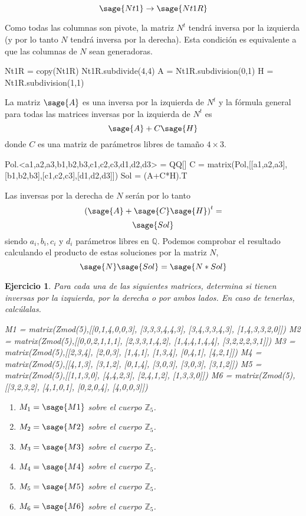 \documentclass{amsart}
\newtheorem{ejer}{Ejercicio}
\begin{document}
$$ \sage{Nt1} \to \sage{Nt1R}$$

Como todas las columnas son pivote, la matriz $N^t$ tendrá inversa por
la izquierda (y por lo tanto $N$ tendrá inversa por la derecha). Esta 
condición es equivalente a que las columnas de $N$ sean generadoras.

\begin{sageblock}
Nt1R = copy(Nt1R)
Nt1R.subdivide(4,4)
A = Nt1R.subdivision(0,1)
H = Nt1R.subdivision(1,1)
\end{sageblock}

La matriz $\sage{A}$ es una inversa por la izquierda de $N^t$ y la fórmula
general para todas las matrices inversas por la izquierda de $N^t$ es
$$ \sage{A} + C \sage{H} $$
donde $C$ es una matriz de parámetros libres de tamaño $4 \times 3$.

\begin{sageblock}
Pol.<a1,a2,a3,b1,b2,b3,c1,c2,c3,d1,d2,d3> = QQ[]
C = matrix(Pol,[[a1,a2,a3],[b1,b2,b3],[c1,c2,c3],[d1,d2,d3]])
Sol = (A+C*H).T
\end{sageblock}

Las inversas por la derecha de $N$ serán por lo tanto
$$ \left( \sage{A} + \sage{C}\sage{H}\right)^t = $$
$$ \sage{Sol} $$
siendo $a_i,b_i,c_i$ y $d_i$ parámetros libres en ${\mathbb Q}$.
Podemos comprobar el resultado calculando el producto de estas soluciones
por la matriz $N$,
$$ \sage{N}\sage{Sol} = \sage{N*Sol}$$


\begin{ejer}
Para cada una de las siguientes matrices, determina si tienen inversas por
la izquierda, por la derecha o por ambos lados. En caso de tenerlas, 
calcúlalas.

\begin{sagecode}
M1 = matrix(Zmod(5),[[0,1,4,0,0,3],
[3,3,3,4,4,3],
[3,4,3,3,4,3],
[1,4,3,3,2,0]])
M2 = matrix(Zmod(5),[[0,0,2,1,1,1],
[2,3,3,1,4,2],
[1,4,4,1,4,4],
[3,2,2,2,3,1]])
M3 = matrix(Zmod(5),[[2,3,4],
[2,0,3],
[1,4,1],
[1,3,4],
[0,4,1],
[4,2,1]])
M4 = matrix(Zmod(5),[[4,1,3],
[3,1,2],
[0,1,4],
[3,0,3],
[3,0,3],
[3,1,2]])
M5 = matrix(Zmod(5),[[1,1,3,0],
[4,4,2,3],
[2,4,1,2],
[1,3,3,0]])
M6 = matrix(Zmod(5),[[3,2,3,2],
[4,1,0,1],
[0,2,0,4],
[4,0,0,3]])
\end{sagecode}

\begin{enumerate}
\item $M_1 = \sage{M1}$ sobre el cuerpo ${\mathbb Z}_5$.
\item $M_2 = \sage{M2}$ sobre el cuerpo ${\mathbb Z}_5$.
\item $M_3 = \sage{M3}$ sobre el cuerpo ${\mathbb Z}_5$.
\item $M_4 = \sage{M4}$ sobre el cuerpo ${\mathbb Z}_5$.
\item $M_5 = \sage{M5}$ sobre el cuerpo ${\mathbb Z}_5$.
\item $M_6 = \sage{M6}$ sobre el cuerpo ${\mathbb Z}_5$.
\end{enumerate}

\end{ejer}
\end{document}
